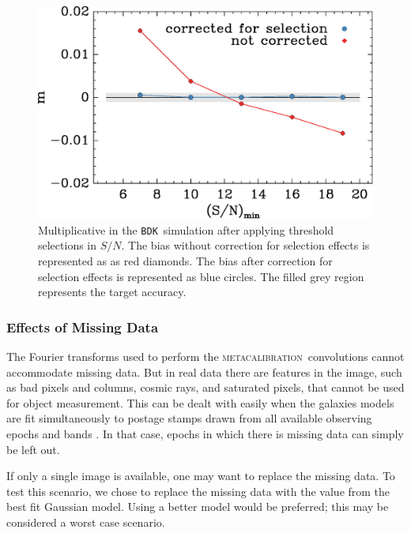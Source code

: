 \documentclass[iop]{emulateapj}
\newcommand{\snr}{$S/N$}
\newcommand{\mcal}{\textsc{metacalibration}}
\newcommand{\bdsim}{\texttt{BDK}}
\begin{document}
\begin{figure}
    \centering
    \includegraphics[width=\columnwidth]{mc-select-bias-thresh-with-nocorr.eps}

    \caption{Multiplicative in the \bdsim\ simulation after applying
        threshold selections in \snr.  The bias without correction for
        selection effects is represented as as red diamonds. The bias after
        correction for selection effects is represented as blue circles.  
        The filled grey region represents the target accuracy. } 

\label{fig:s2nthresh_nocorr}
\end{figure}



\subsubsection{Effects of Missing Data}

The Fourier transforms used to perform the \mcal\ convolutions cannot
accommodate missing data.  But in real data there are features in the image,
such as bad pixels and columns, cosmic rays, and saturated pixels, that cannot
be used for object measurement.  This can be dealt with easily when the
galaxies models are fit simultaneously to postage stamps drawn from all
available observing epochs and bands \citep[e.g.][]{Jarvis2016}.  In that case,
epochs in which there is missing data can simply be left out.

If only a single image is available, one may want to replace the missing data.
To test this scenario, we chose to replace the missing data with the value from
the best fit Gaussian model.  Using a better model would be preferred; this may
be considered a worst case scenario.
\end{document}
